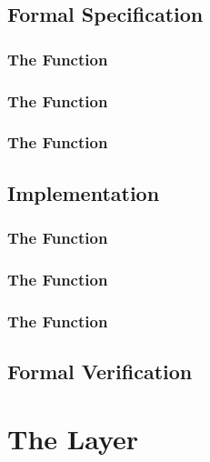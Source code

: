 \documentclass[paper=a4,12pt,DIV16,BCOR8mm,twoside]{scrreprt}
\begin{document}
\subsection{}

\section{Formal Specification}
\subsection{The Function }
\subsection{The Function }
\subsection{The Function }

\section{Implementation}
\subsection{The Function }
\subsection{The Function }
\subsection{The Function }

\section{Formal Verification}
\subsection{}
\subsection{}

\chapter{The  Layer}
\end{document}

